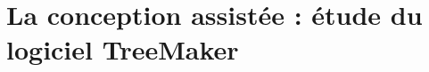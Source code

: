 \documentclass[a4paper,12pt,french,draft]{report}
\begin{document}
      \begin{theorem}
      
      \end{theorem}
    
    






\chapter{La conception assistée : étude du logiciel TreeMaker}
\end{document}
